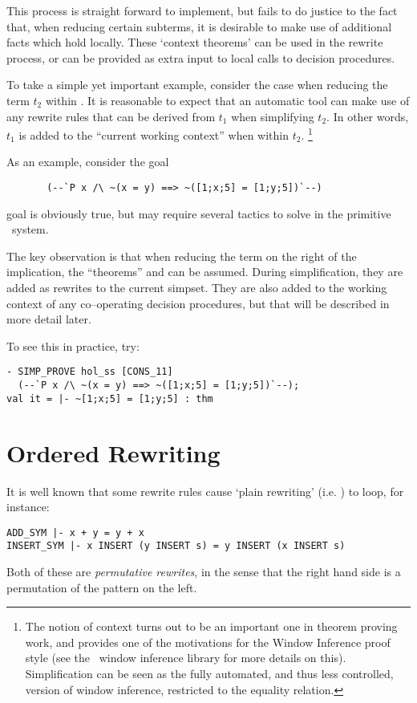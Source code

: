 \documentclass[a4]{article}
\begin{document}
This process is straight forward to implement, but fails to do justice to the
fact that, when reducing certain subterms, it is desirable
to make use of additional facts which hold
locally.  These `context theorems' can be used
in the rewrite process, or can be provided as extra input to
local calls to decision procedures.

To take a simple yet important example, consider
the case when reducing the term $t_2$ within .
It is reasonable to expect that an automatic tool can make use of any rewrite
rules that can be derived from $t_1$ when simplifying $t_2$.
In other words, $t_1$ is added to the ``current working context'' when
within $t_2$. \footnote{The notion of context turns out to be an important one
in theorem proving work, and provides one of the
motivations for the Window Inference proof style (see the
\HOL\ window inference library for more details on this).
Simplification can be seen as the fully automated, and thus
less controlled, version of window inference, restricted to the equality
relation.}

As an example, consider the goal
\begin{verbatim}
       (--`P x /\ ~(x = y) ==> ~([1;x;5] = [1;y;5])`--)
\end{verbatim}
goal is obviously true, but may require several tactics to solve
in the primitive \HOL\ system.

The key observation is that when reducing the term on the right of the
implication, the ``theorems''  and  can
be assumed.  During simplification, they are added as
rewrites to the current simpset.  They are also added to the
working context of any co--operating decision procedures, but that
will be described in more detail later.

To see this in practice, try:
\begin{boxed} \begin{verbatim}
- SIMP_PROVE hol_ss [CONS_11]
  (--`P x /\ ~(x = y) ==> ~([1;x;5] = [1;y;5])`--);
val it = |- ~[1;x;5] = [1;y;5] : thm
\end{verbatim} \end{boxed}


\section{Ordered Rewriting}

\label{ordered-rewriting}

It is well known that some rewrite rules cause `plain rewriting'
(i.e. ) to loop, for instance:
\begin{hol} \begin{verbatim}
ADD_SYM |- x + y = y + x
INSERT_SYM |- x INSERT (y INSERT s) = y INSERT (x INSERT s)
\end{verbatim} \end{hol}
Both of these are {\em permutative rewrites}, in the sense that
the right hand side is a permutation of the pattern on the left.
\end{document}
